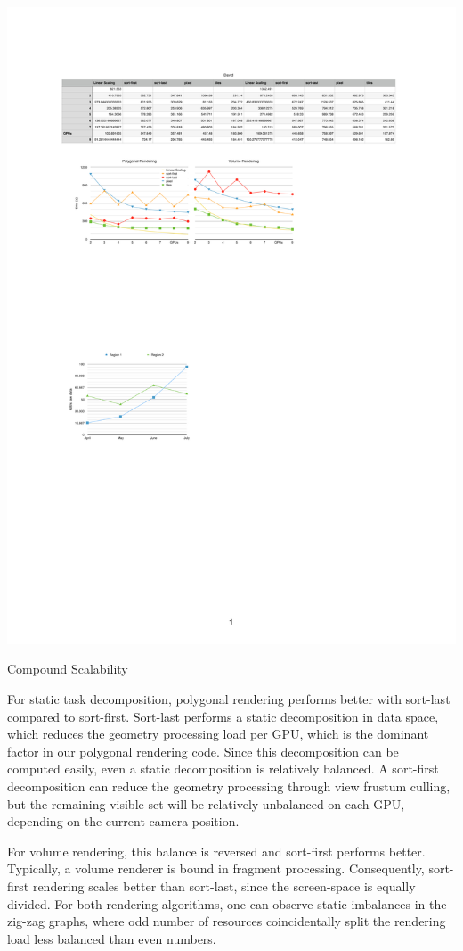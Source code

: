 \begin{benchmark}[h!t]\center
 \includegraphics[width=\columnwidth]{results/static}
 {\caption{\label{rStatic}Compound Scalability}}
\end{benchmark}


For static task decomposition, polygonal rendering performs better with
sort-last compared to sort-first. Sort-last performs a static decomposition in
data space, which reduces the geometry processing load per GPU, which is the
dominant factor in our polygonal rendering code. Since this decomposition can
be computed easily, even a static decomposition is relatively balanced. A
sort-first decomposition can reduce the geometry processing through view
frustum culling, but the remaining visible set will be relatively unbalanced on
each GPU, depending on the current camera position.

For volume rendering, this balance is reversed and sort-first performs better.
Typically, a volume renderer is bound in fragment processing. Consequently,
sort-first rendering scales better than sort-last, since the screen-space is
equally divided. For both rendering algorithms, one can observe static
imbalances in the zig-zag graphs, where odd number of resources coincidentally
split the rendering load less balanced than even numbers.

